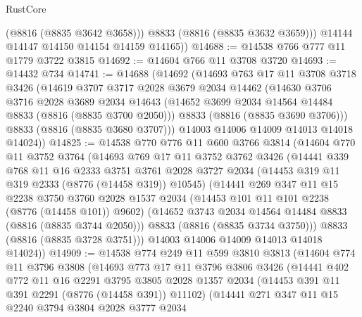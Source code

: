 \begin{lexlean}{RustCore}
\begin{coremodule}
            (@8816 (@8835 @3642 @3658)))
          @8833
          (@8816 (@8835 @3632 @3659)))
        @14144
        @14147
        @14150
        @14154
        @14159
        @14165))
@14688 := @14538 @766 @777 @11 @1779 @3722 @3815
@14692 := @14604 @766 @11 @3708 @3720
@14693 := @14432 @734
@14741 := @14688
    (@14692
      (@14693
        @763
        @17
        @11
        @3708
        @3718
        @3426
        (@14619
          @3707
          @3717
          @2028
          @3679
          @2034
          @14462
          (@14630
            @3706
            @3716
            @2028
            @3689
            @2034
            @14643
            (@14652 @3699 @2034 @14564 @14484 @8833 (@8816 (@8835 @3700 @2050)))
            @8833
            (@8816 (@8835 @3690 @3706)))
          @8833
          (@8816 (@8835 @3680 @3707)))
        @14003
        @14006
        @14009
        @14013
        @14018
        @14024))
@14825 := @14538
    @770
    @776
    @11
    @600
    @3766
    @3814
    (@14604
      @770
      @11
      @3752
      @3764
      (@14693
        @769
        @17
        @11
        @3752
        @3762
        @3426
        (@14441
          @339
          @768
          @11
          @16
          @2333
          @3751
          @3761
          @2028
          @3727
          @2034
          (@14453 @319 @11 @319 @2333 (@8776 (@14458 @319)) @10545)
          (@14441
            @269
            @347
            @11
            @15
            @2238
            @3750
            @3760
            @2028
            @1537
            @2034
            (@14453 @101 @11 @101 @2238 (@8776 (@14458 @101)) @9602)
            (@14652 @3743 @2034 @14564 @14484 @8833 (@8816 (@8835 @3744 @2050)))
            @8833
            (@8816 (@8835 @3734 @3750)))
          @8833
          (@8816 (@8835 @3728 @3751)))
        @14003
        @14006
        @14009
        @14013
        @14018
        @14024))
@14909 := @14538
    @774
    @249
    @11
    @599
    @3810
    @3813
    (@14604
      @774
      @11
      @3796
      @3808
      (@14693
        @773
        @17
        @11
        @3796
        @3806
        @3426
        (@14441
          @402
          @772
          @11
          @16
          @2291
          @3795
          @3805
          @2028
          @1357
          @2034
          (@14453 @391 @11 @391 @2291 (@8776 (@14458 @391)) @11102)
          (@14441
            @271
            @347
            @11
            @15
            @2240
            @3794
            @3804
            @2028
            @3777
            @2034

\end{coremodule}
\end{lexlean}

